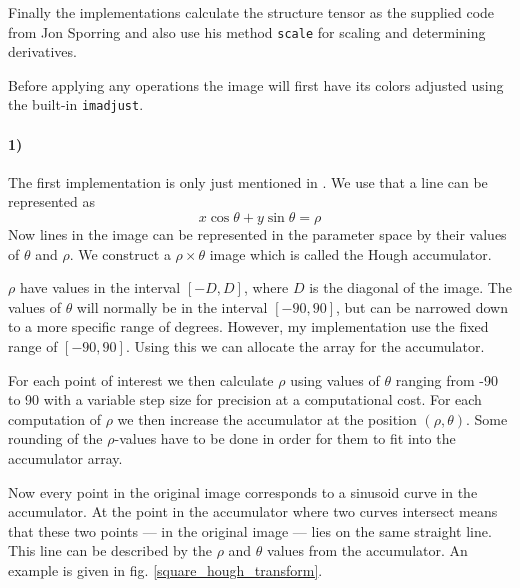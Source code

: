 \documentclass[a4paper, 10pt, final]{article}
\begin{document}
Finally the implementations calculate the structure tensor as the
supplied code from Jon Sporring and also use his method \texttt{scale}
for scaling and determining derivatives.

Before applying any operations the image will first have its colors
adjusted using the built-in \texttt{imadjust}.

\paragraph{1)}
The first implementation is only just mentioned in \citep[section
16.5.2, p. 458-460]{jahne-digital}. We use that a line can be
represented as
\begin{equation}
    x\cos\theta+y\sin\theta = \rho
\end{equation}
Now lines in the image can be represented in the parameter space by
their values of $\theta$ and $\rho$. We construct a $\rho\times\theta$
image which is called the Hough accumulator.

$\rho$ have values in the interval $[-D, D]$, where $D$ is the diagonal
of the image. The values of $\theta$ will normally be in the interval
$[-90, 90]$, but can be narrowed down to a more specific range of
degrees. However, my implementation use the fixed range of $[-90,90]$.
Using this we can allocate the array for the accumulator.

For each point of interest we then calculate $\rho$ using values of
$\theta$ ranging from -90 to 90 with a variable step size for precision
at a computational cost. For each computation of $\rho$ we then
increase the accumulator at the position $(\rho, \theta)$. Some rounding
of the $\rho$-values have to be done in order for them to fit into the
accumulator array.

Now every point in the original image corresponds to a sinusoid curve in
the accumulator. At the point in the accumulator where two curves
intersect means that these two points --- in the original image --- lies
on the same straight line. This line can be described by the $\rho$ and
$\theta$ values from the accumulator. An example is given in fig.
\ref{square_hough_transform}.
\end{document}
